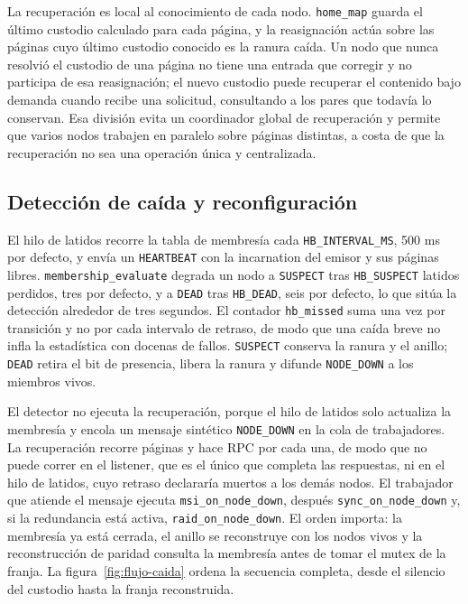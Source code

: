 La recuperación es local al conocimiento de cada nodo. \texttt{home\_map} guarda el último custodio calculado para cada página, y la reasignación actúa sobre las páginas cuyo último custodio conocido es la ranura caída. Un nodo que nunca resolvió el custodio de una página no tiene una entrada que corregir y no participa de esa reasignación; el nuevo custodio puede recuperar el contenido bajo demanda cuando recibe una solicitud, consultando a los pares que todavía lo conservan. Esa división evita un coordinador global de recuperación y permite que varios nodos trabajen en paralelo sobre páginas distintas, a costa de que la recuperación no sea una operación única y centralizada.

\subsection{Detección de caída y reconfiguración}

El hilo de latidos recorre la tabla de membresía cada \texttt{HB\_INTERVAL\_MS}, 500 ms por defecto, y envía un \texttt{HEARTBEAT} con la incarnation del emisor y sus páginas libres. \texttt{membership\_evaluate} degrada un nodo a \texttt{SUSPECT} tras \texttt{HB\_SUSPECT} latidos perdidos, tres por defecto, y a \texttt{DEAD} tras \texttt{HB\_DEAD}, seis por defecto, lo que sitúa la detección alrededor de tres segundos. El contador \texttt{hb\_missed} suma una vez por transición y no por cada intervalo de retraso, de modo que una caída breve no infla la estadística con docenas de fallos. \texttt{SUSPECT} conserva la ranura y el anillo; \texttt{DEAD} retira el bit de presencia, libera la ranura y difunde \texttt{NODE\_DOWN} a los miembros vivos.

El detector no ejecuta la recuperación, porque el hilo de latidos solo actualiza la membresía y encola un mensaje sintético \texttt{NODE\_DOWN} en la cola de trabajadores. La recuperación recorre páginas y hace RPC por cada una, de modo que no puede correr en el listener, que es el único que completa las respuestas, ni en el hilo de latidos, cuyo retraso declararía muertos a los demás nodos. El trabajador que atiende el mensaje ejecuta \texttt{msi\_on\_node\_down}, después \texttt{sync\_on\_node\_down} y, si la redundancia está activa, \texttt{raid\_on\_node\_down}. El orden importa: la membresía ya está cerrada, el anillo se reconstruye con los nodos vivos y la reconstrucción de paridad consulta la membresía antes de tomar el mutex de la franja. La figura~\ref{fig:flujo-caida} ordena la secuencia completa, desde el silencio del custodio hasta la franja reconstruida.

